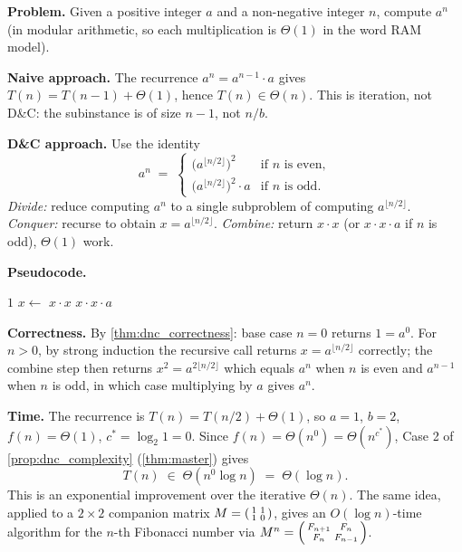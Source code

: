 \begin{example}
\label{ex:fast_exp}
\textbf{Problem.} Given a positive integer $a$ and a non-negative integer $n$, compute $a^n$ (in modular arithmetic, so each multiplication is $\Theta(1)$ in the word RAM model).

\medskip
\noindent\textbf{Naive approach.} The recurrence $a^n = a^{n-1} \cdot a$ gives $T(n) = T(n-1) + \Theta(1)$, hence $T(n) \in \Theta(n)$. This is iteration, not D\&C: the subinstance is of size $n - 1$, not $n / b$.

\medskip
\noindent\textbf{D\&C approach.} Use the identity
\[
  a^n \;=\;
  \begin{cases}
    \bigl(a^{\lfloor n/2 \rfloor}\bigr)^{\!2} & \text{if } n \text{ is even}, \\
    \bigl(a^{\lfloor n/2 \rfloor}\bigr)^{\!2} \cdot a & \text{if } n \text{ is odd}.
  \end{cases}
\]
\textit{Divide:} reduce computing $a^n$ to a single subproblem of computing $a^{\lfloor n/2 \rfloor}$. \textit{Conquer:} recurse to obtain $x = a^{\lfloor n/2 \rfloor}$. \textit{Combine:} return $x \cdot x$ (or $x \cdot x \cdot a$ if $n$ is odd), $\Theta(1)$ work.

\medskip
\noindent\textbf{Pseudocode.}
\begin{algorithmic}
   \Return $1$ \EndIf
  \State $x \gets$ 
   \Return $x \cdot x$
  \Else{} \Return $x \cdot x \cdot a$
  \EndIf
\EndFunction
\end{algorithmic}

\medskip
\noindent\textbf{Correctness.} By \cref{thm:dnc_correctness}: base case $n = 0$ returns $1 = a^0$. For $n > 0$, by strong induction the recursive call returns $x = a^{\lfloor n/2 \rfloor}$ correctly; the combine step then returns $x^2 = a^{2\lfloor n/2 \rfloor}$ which equals $a^n$ when $n$ is even and $a^{n-1}$ when $n$ is odd, in which case multiplying by $a$ gives $a^n$.

\medskip
\noindent\textbf{Time.} The recurrence is $T(n) = T(n/2) + \Theta(1)$, so $a = 1$, $b = 2$, $f(n) = \Theta(1)$, $c^* = \log_2 1 = 0$. Since $f(n) = \Theta(n^0) = \Theta(n^{c^*})$, Case 2 of \cref{prop:dnc_complexity} (\cref{thm:master}) gives
\[
  T(n) \;\in\; \Theta(n^0 \log n) \;=\; \Theta(\log n).
\]
This is an exponential improvement over the iterative $\Theta(n)$. The same idea, applied to a $2 \times 2$ companion matrix $M = \begin{psmallmatrix} 1 & 1 \\ 1 & 0 \end{psmallmatrix}$, gives an $O(\log n)$-time algorithm for the $n$-th Fibonacci number via $M^n = \begin{psmallmatrix} F_{n+1} & F_n \\ F_n & F_{n-1} \end{psmallmatrix}$.
\end{example}

